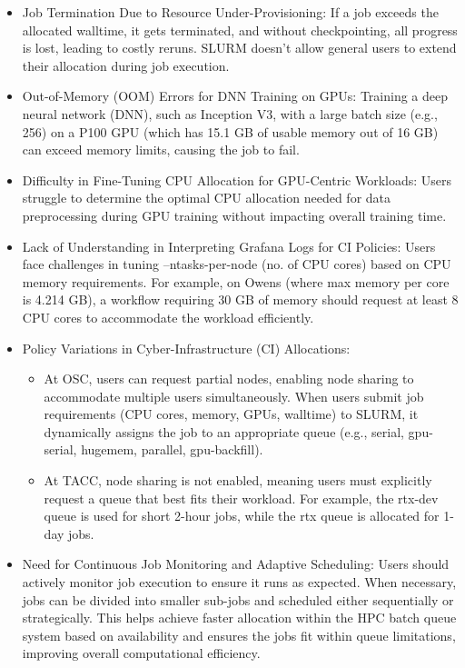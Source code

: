 \begin{itemize}
    \item Job Termination Due to Resource Under-Provisioning: If a job exceeds the allocated walltime, it gets terminated, and without checkpointing, all progress is lost, leading to costly reruns. SLURM doesn't allow general users to extend their allocation during job execution. 
    \item Out-of-Memory (OOM) Errors for DNN Training on GPUs: Training a deep neural network (DNN), such as Inception V3, with a large batch size (e.g., 256) on a P100 GPU (which has 15.1 GB of usable memory out of 16 GB) can exceed memory limits, causing the job to fail.
    \item Difficulty in Fine-Tuning CPU Allocation for GPU-Centric Workloads: Users struggle to determine the optimal CPU allocation needed for data preprocessing during GPU training without impacting overall training time.
    \item Lack of Understanding in Interpreting Grafana Logs for CI Policies: Users face challenges in tuning --ntasks-per-node (no. of CPU cores) based on CPU memory requirements. For example, on Owens (where max memory per core is 4.214 GB), a workflow requiring 30 GB of memory should request at least 8 CPU cores to accommodate the workload efficiently.
    \item Policy Variations in Cyber-Infrastructure (CI) Allocations: \begin{itemize}
        \item At OSC, users can request partial nodes, enabling node sharing to accommodate multiple users simultaneously. When users submit job requirements (CPU cores, memory, GPUs, walltime) to SLURM, it dynamically assigns the job to an appropriate queue (e.g., serial, gpu-serial, hugemem, parallel, gpu-backfill).
        \item At TACC, node sharing is not enabled, meaning users must explicitly request a queue that best fits their workload. For example, the rtx-dev queue is used for short 2-hour jobs, while the rtx queue is allocated for 1-day jobs.
    \end{itemize}
    \item Need for Continuous Job Monitoring and Adaptive Scheduling: Users should actively monitor job execution to ensure it runs as expected. When necessary, jobs can be divided into smaller sub-jobs and scheduled either sequentially or strategically. This helps achieve faster allocation within the HPC batch queue system based on availability and ensures the jobs fit within queue limitations, improving overall computational efficiency.
\end{itemize}

